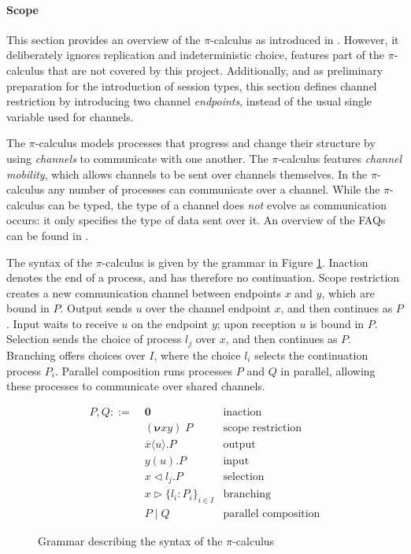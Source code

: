 \documentclass{mproj}
\newcommand{\PO}{\mathbf{0}}
\newcommand{\comp}[2]{#1 \mid #2}
\newcommand{\new}[2]{(\boldsymbol{\nu} #1 #2) \;}
\newcommand{\cout}[2]{\overline{#1}\langle#2\rangle.}
\newcommand{\cin}[2]{#1(#2).}
\newcommand{\select}[2]{#1\triangleleft#2.}
\newcommand{\branch}[2]{#1\triangleright#2}
\newcommand{\picalc}{$\pi$-calculus}
\begin{document}
\paragraph{Scope} This section provides an overview of the \picalc{} as introduced in \cite{Sangiorgi2001}. However, it deliberately ignores replication and indeterministic choice, features part of the \picalc{} that are not covered by this project. Additionally, and as preliminary preparation for the introduction of session types, this section defines channel restriction by introducing two channel \emph{endpoints}, instead of the usual single variable used for channels.

The \picalc{} \cite{Walker1989,Milner1989,Milner1991,Sangiorgi2001} models processes that progress and change their structure by using \emph{channels} to communicate with one another. The \picalc{} features \emph{channel mobility}, which allows channels to be sent over channels themselves. In the \picalc{} any number of processes can communicate over a channel. While the \picalc{} can be typed, the type of a channel does \emph{not} evolve as communication occurs: it only specifies the type of data sent over it. An overview of the FAQs can be found in \cite{Wing2002}.

The syntax of the \picalc{} is given by the grammar in Figure \ref{picalc-syntax}. Inaction denotes the end of a process, and has therefore no continuation. Scope restriction creates a new communication channel between endpoints $x$ and $y$, which are bound in $P$. Output sends $u$ over the channel endpoint $x$, and then continues as $P$. Input waits to receive $u$ on the endpoint $y$; upon reception $u$ is bound in $P$. Selection sends the choice of process $l_j$ over $x$, and then continues as $P$. Branching offers choices over $I$, where the choice $l_i$ selects the continuation process $P_i$. Parallel composition runs processes $P$ and $Q$ in parallel, allowing these processes to communicate over shared channels.

\begin{figure}[H]
    \begin{align*}
    P,Q ::= \; &\PO                      & \text{inaction}             \\
               &\new{x}{y}P              & \text{scope restriction}    \\
               &\cout{x}{u}P             & \text{output}               \\
               &\cin{y}{u}P              & \text{input}                \\
               &\select{x}{l_j}P         & \text{selection}            \\
               &\branch{x}
               {\{l_i : P_i\}_{i \in I}} & \text{branching}            \\
               &\comp{P}{Q}              & \text{parallel composition}
    \end{align*}
    \caption{Grammar describing the syntax of the \picalc{}}
    \label{picalc-syntax}
\end{figure}
\end{document}
